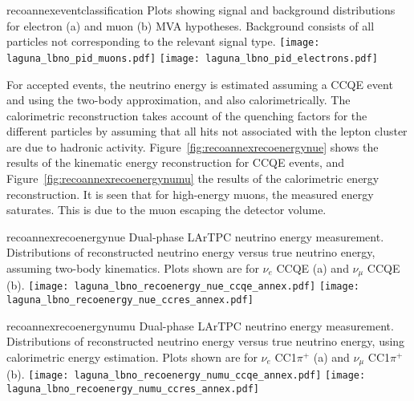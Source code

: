 

\begin{cdrfigure}{recoannexeventclassification}
{Plots showing signal and background distributions for electron (a) and muon (b) MVA hypotheses. 
Background consists of all particles not corresponding to the relevant signal type.}
\texttt{[image: laguna\_lbno\_pid\_muons.pdf]}
\texttt{[image: laguna\_lbno\_pid\_electrons.pdf]}
\end{cdrfigure}


For accepted events, the neutrino energy is estimated  assuming a CCQE event and using the two-body approximation, and also calorimetrically.
The calorimetric reconstruction takes account of the quenching factors for the different particles by 
assuming that all hits not associated with the lepton cluster are due to hadronic activity.
Figure~\ref{fig:recoannexrecoenergynue} shows the results of the kinematic energy reconstruction for CCQE events, and  Figure~\ref{fig:recoannexrecoenergynumu} the results of the calorimetric energy reconstruction.
It is seen that for high-energy muons, the measured energy saturates. This is due to the muon escaping the detector volume. 




\begin{cdrfigure}{recoannexrecoenergynue}
{Dual-phase LArTPC neutrino energy measurement. Distributions of reconstructed neutrino energy versus true neutrino energy, assuming two-body kinematics. 
Plots shown are for $\nu_{e}$ CCQE (a) and $\nu_{\mu}$ CCQE (b).}
\texttt{[image: laguna\_lbno\_recoenergy\_nue\_ccqe\_annex.pdf]}
\texttt{[image: laguna\_lbno\_recoenergy\_nue\_ccres\_annex.pdf]}
\end{cdrfigure}

\begin{cdrfigure}{recoannexrecoenergynumu}
{Dual-phase LArTPC neutrino energy measurement. Distributions of reconstructed neutrino energy versus true neutrino energy, using calorimetric energy estimation. 
Plots shown are for  $\nu_{e}$  CC1$\pi^{+}$ (a) and $\nu_{\mu}$  CC1$\pi^{+}$ (b).}
\texttt{[image: laguna\_lbno\_recoenergy\_numu\_ccqe\_annex.pdf]}
\texttt{[image: laguna\_lbno\_recoenergy\_numu\_ccres\_annex.pdf]}
\end{cdrfigure}


